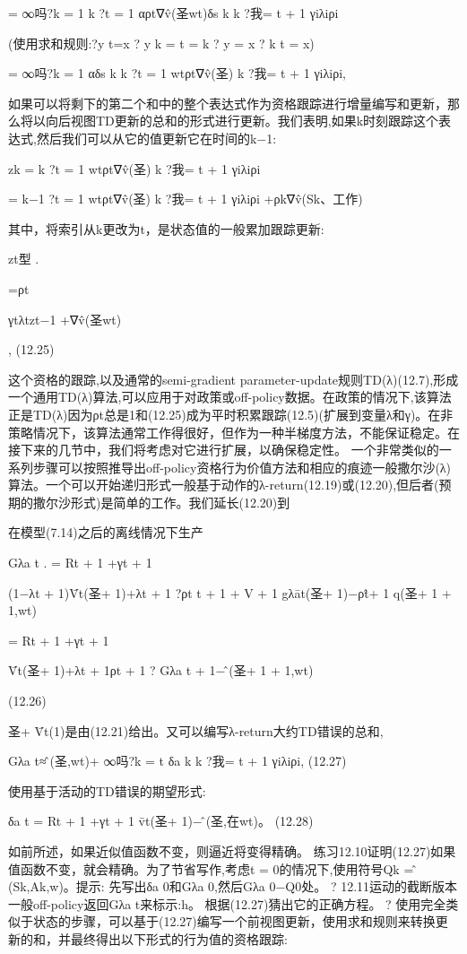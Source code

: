 =
∞吗?k = 1
k ?t = 1
αρt∇v̂(圣wt)δs k
k ?我= t + 1
γiλiρi

(使用求和规则:?y t=x
? y k = t =
k ? y = x
? k t = x)

=
∞吗?k = 1
αδs k
k ?t = 1
wtρt∇v̂(圣)
k ?我= t + 1
γiλiρi,


如果可以将剩下的第二个和中的整个表达式作为资格跟踪进行增量编写和更新，那么将以向后视图TD更新的总和的形式进行更新。我们表明,如果k时刻跟踪这个表达式,然后我们可以从它的值更新它在时间的k−1:

zk =
k ?t = 1
wtρt∇v̂(圣)
k ?我= t + 1
γiλiρi

=
k−1 ?t = 1
wtρt∇v̂(圣)
k ?我= t + 1
γiλiρi +ρk∇v̂(Sk、工作)
 
其中，将索引从k更改为t，是状态值的一般累加跟踪更新:

zt型
.

=ρt

γtλtzt−1 +∇v̂(圣wt)

, 					(12.25)

这个资格的跟踪,以及通常的semi-gradient parameter-update规则TD(λ)(12.7),形成一个通用TD(λ)算法,可以应用于对政策或off-policy数据。在政策的情况下,该算法正是TD(λ)因为ρt总是1和(12.25)成为平时积累跟踪(12.5)(扩展到变量λ和γ)。在非策略情况下，该算法通常工作得很好，但作为一种半梯度方法，不能保证稳定。在接下来的几节中，我们将考虑对它进行扩展，以确保稳定性。
一个非常类似的一系列步骤可以按照推导出off-policy资格行为价值方法和相应的痕迹一般撒尔沙(λ)算法。一个可以开始递归形式一般基于动作的λ-return(12.19)或(12.20),但后者(预期的撒尔沙形式)是简单的工作。我们延长(12.20)到

在模型(7.14)之后的离线情况下生产

Gλa t
.
= Rt + 1 +γt + 1

(1−λt + 1)V̄t(圣+ 1)+λt + 1 ?ρt t + 1 + V + 1 gλāt(圣+ 1)−ρt̂+ 1 q(圣+ 1 + 1,wt)

= Rt + 1 +γt + 1

V̄t(圣+ 1)+λt + 1ρt + 1 ? Gλa t + 1−问̂(圣+ 1 + 1,wt)

(12.26)

圣+ V̄t(1)是由(12.21)给出。又可以编写λ-return大约TD错误的总和,

Gλa t≈问̂(圣,wt)+
∞吗?k = t
δa k
k ?我= t + 1
γiλiρi, 					(12.27)

使用基于活动的TD错误的期望形式:

δa t = Rt + 1 +γt + 1 v̄t(圣+ 1)−问̂(圣,在wt)。 					(12.28)

如前所述，如果近似值函数不变，则逼近将变得精确。
练习12.10证明(12.27)如果值函数不变，就会精确。为了节省写作,考虑t = 0的情况下,使用符号Qk =问̂(Sk,Ak,w)。提示:
先写出δa 0和Gλa 0,然后Gλa 0−Q0处。 					?
12.11运动的截断版本一般off-policy返回Gλa t来标示:h。
根据(12.27)猜出它的正确方程。 					?
使用完全类似于状态的步骤，可以基于(12.27)编写一个前视图更新，使用求和规则来转换更新的和，并最终得出以下形式的行为值的资格跟踪:

